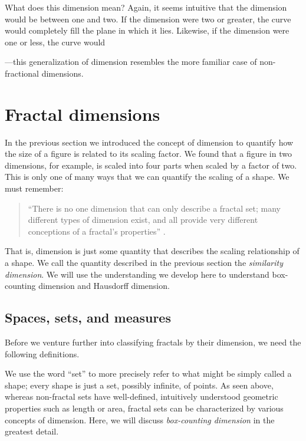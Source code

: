 \begin{myremark}What does this dimension mean? Again, it seems intuitive that the dimension would be between one and two. If the dimension were two or greater, the curve would completely fill the plane in which it lies. Likewise, if the dimension were one or less, the curve would 


---this generalization of dimension resembles the more familiar case of non-fractional dimensions. \end{myremark}

\section{Fractal dimensions}
In the previous section we introduced the concept of dimension to quantify how the size of a figure is related to its scaling factor. We found that a figure in two dimensions, for example, is scaled into four parts when scaled by a factor of two. This is only one of many ways that we can quantify the scaling of a shape. We must remember:

\begin{quote}
``There is no one dimension that can only describe a fractal set; many different types of dimension exist, and all provide very different conceptions of a fractal's properties'' \citep{fractaltextbook}.
\end{quote}

That is, dimension is just some quantity that describes the scaling relationship of a shape. We call the quantity described in the previous section the \emph{similarity dimension}. We will use the understanding we develop here to understand box-counting dimension and Hausdorff dimension.

\subsection{Spaces, sets, and measures}
Before we venture further into classifying fractals by their dimension, we need the following definitions.

We use the word ``set'' to more precisely refer to what might be simply called a shape; every shape is just a set, possibly infinite, of points. As seen above, whereas non-fractal sets have well-defined, intuitively understood geometric properties such as length or area, fractal sets can be characterized by various concepts of dimension. Here, we will discuss \textit{box-counting dimension} in the greatest detail.

